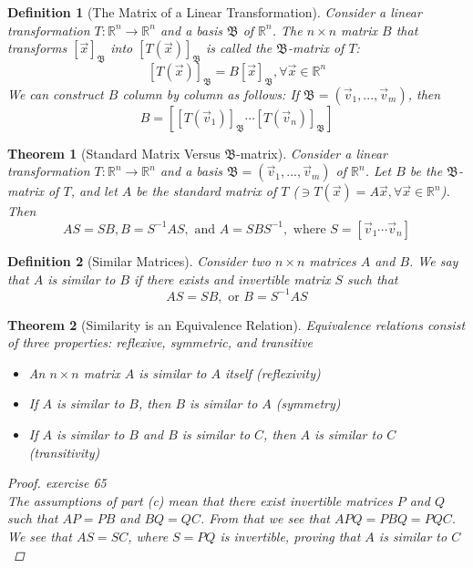 \documentclass[10pt]{report}
\newtheorem{thm2}{Theorem}[section]
\newtheorem{def2}{Definition}[section]
\begin{document}
\begin{def2}[The Matrix of a Linear Transformation]
Consider a linear transformation $T:\mathbb{R}^n \to \mathbb{R}^n$ and a basis $\mathfrak{B}$ of $\mathbb{R}^n$. The $n\times n$ matrix $B$ that transforms $[\vec{x}]_\mathfrak{B}$ into $[T(\vec{x})]_\mathfrak{B}$ is called the $\mathfrak{B}$-matrix of $T$:
$$[T(\vec{x})]_\mathfrak{B}=B[\vec{x}]_\mathfrak{B}, \forall \vec{x} \in \mathbb{R}^n$$
We can construct $B$ column by column as follows: If $\mathfrak{B}=(\vec{v}_1, ...,\vec{v}_m)$, then
$$B=[[T(\vec{v}_1)]_\mathfrak{B} \cdots [T(\vec{v}_n)]_\mathfrak{B}]$$
\end{def2}
\begin{thm2}[Standard Matrix Versus $\mathfrak{B}$-matrix]
Consider a linear transformation $T: \mathbb{R}^n \to \mathbb{R}^n$ and a basis $\mathfrak{B}=(\vec{v}_1, ...,\vec{v}_m)$ of $\mathbb{R}^n$. Let $B$ be the $\mathfrak{B}$-matrix of $T$, and let $A$ be the standard matrix of $T$ ($\ni T(\vec{x})=A\vec{x}, \forall \vec{x} \in \mathbb{R}^n$). Then
$$AS = SB, B=S^{-1}AS, \text{ and } A=SBS^{-1}, \text{ where } S = [\vec{v}_1 \cdots \vec{v}_n]$$
\end{thm2}
\begin{def2}[Similar Matrices]
Consider two $n\times n$ matrices $A$ and $B$. We say that $A$ is similar to $B$ if there exists and invertible matrix $S$ such that 
$$AS = SB, \text{ or } B = S^{-1}AS$$
\end{def2}
\begin{thm2}[Similarity is an Equivalence Relation]
Equivalence relations consist of three properties: reflexive, symmetric, and transitive
\begin{itemize}
\item[a.] An $n\times n$ matrix $A$ is similar to $A$ itself (reflexivity)
\item[b.] If $A$ is similar to $B$, then $B$ is similar to $A$ (symmetry)
\item[c.] If $A$ is similar to $B$ and $B$ is similar to $C$, then $A$ is similar to $C$ (transitivity)
\end{itemize}
\begin{proof}
exercise 65\\
The assumptions of part (c) mean that there exist invertible matrices $P$ and $Q$ such that $AP=PB$ and $BQ=QC$. From that we see that $APQ = PBQ = PQC$. We see that $AS=SC$, where $S=PQ$ is invertible, proving that $A$ is similar to $C$
\end{proof}
\end{thm2}
\end{document}
